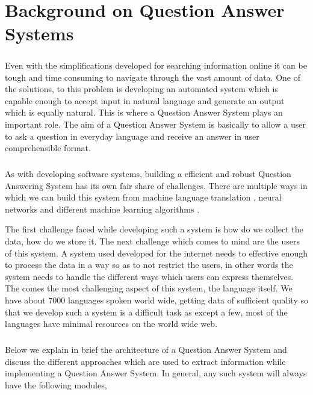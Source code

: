 \chapter{Background on Question Answer Systems}

\paragraph{}
Even with the simplifications developed for searching information online it can be tough and time consuming to navigate through the vast amount of data. One of the solutions, to this problem is developing an automated system which is capable enough to accept input in natural language and generate an output which is equally natural. This is where a Question Answer System plays an important role. The aim of a Question Answer System is basically to allow a user to ask a question in everyday language and receive an answer in user comprehensible format. 

\paragraph{}
As with developing software systems, building a efficient and robust Question Answering System has its own fair share of challenges. There are multiple ways in which we can build this system from  machine language translation \cite {bao2014knowledge}, neural networks \cite{iyyer2014neural} and different machine learning algorithms \cite{zhang2003question}.

The first challenge faced while developing such a system is how do we collect the data, how do we store it. The next challenge which comes to mind are the users of this system. A system used developed for the internet needs to effective enough to process the data in a way so as to not restrict the users, in other words the system needs to handle the different ways which users can express themselves. The comes the most challenging aspect of this system, the language itself. We have about 7000 languages spoken world wide, getting data of sufficient quality so that we develop such a system is a difficult task as except a few, most of the languages have minimal resources on the world wide web.
 
\paragraph{}
Below we explain in brief the architecture of a Question Answer System and discuss the different approaches which are used to extract information while implementing a Question Answer System. In general, any such system will always have the following modules,

